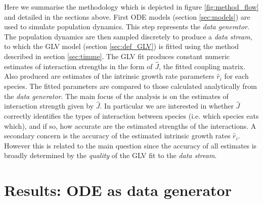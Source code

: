 Here we summarise the methodology which is depicted in figure \ref{fig:method_flow} and detailed in the sections above. First ODE models (section \ref{sec:models}) are used to simulate population dynamics. This step represents the \emph{data generator}. The population dynamics are then sampled discretely to produce a \emph{data stream}, to which the GLV model (section \ref{sec:def_GLV}) is fitted using the method described in section \ref{sec:timme}. The GLV fit produces constant numeric estimates of interaction strengths in the form of $\hat{J}$, the fitted coupling matrix. Also produced are estimates of the intrinsic growth rate parameters $\hat{r}_i$ for each species. The fitted parameters are compared to those calculated analytically from the \emph{data generator}. The main focus of the analysis is on the estimates of interaction strength given by $\hat{J}$. In particular we are interested in whether $\hat{J}$ correctly identifies the types of interaction between species (i.e. which species eats which), and if so, how accurate are the estimated strengths of the interactions. A secondary concern is the accuracy of the estimated intrinsic growth rates $\hat{r}_i$. However this is related to the main question since the accuracy of all estimates is broadly determined by the \emph{quality} of the GLV fit to the \emph{data stream}.





\section{Results: ODE as data generator}
\label{sec:results}

